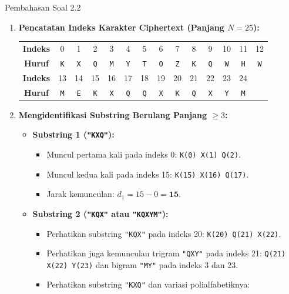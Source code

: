 \documentclass[11pt,a4paper]{article}
\begin{document}
\begin{solusibox}{Pembahasan Soal 2.2}
\begin{enumerate}[leftmargin=*]
    \item \textbf{Pencatatan Indeks Karakter Ciphertext (Panjang $N = 25$):}
    \begin{center}
    \footnotesize
    \begin{tabular}{c ccccc ccccc ccc}
    \toprule
    \textbf{Indeks} & 0 & 1 & 2 & 3 & 4 & 5 & 6 & 7 & 8 & 9 & 10 & 11 & 12 \\
    \textbf{Huruf}  & \texttt{K} & \texttt{X} & \texttt{Q} & \texttt{M} & \texttt{Y} & \texttt{T} & \texttt{O} & \texttt{Z} & \texttt{K} & \texttt{Q} & \texttt{W} & \texttt{H} & \texttt{W} \\
    \midrule
    \textbf{Indeks} & 13 & 14 & 15 & 16 & 17 & 18 & 19 & 20 & 21 & 22 & 23 & 24 & \\
    \textbf{Huruf}  & \texttt{M} & \texttt{E} & \texttt{K} & \texttt{X} & \texttt{Q} & \texttt{Q} & \texttt{X} & \texttt{K} & \texttt{Q} & \texttt{X} & \texttt{Y} & \texttt{M} & \\
    \bottomrule
    \end{tabular}
    \end{center}
    \item \textbf{Mengidentifikasi Substring Berulang Panjang $\ge 3$:}
    \begin{itemize}
        \item \textbf{Substring 1 (\texttt{"KXQ"}):}
        \begin{itemize}
            \item Muncul pertama kali pada indeks 0: \texttt{K(0) X(1) Q(2)}.
            \item Muncul kedua kali pada indeks 15: \texttt{K(15) X(16) Q(17)}.
            \item Jarak kemunculan: $d_1 = 15 - 0 = \mathbf{15}$.
        \end{itemize}
        \item \textbf{Substring 2 (\texttt{"KQX"} atau \texttt{"KQXYM"}):}
        \begin{itemize}
            \item Perhatikan substring \texttt{"KQX"} pada indeks 20: \texttt{K(20) Q(21) X(22)}.
            \item Perhatikan juga kemunculan trigram \texttt{"QXY"} pada indeks 21: \texttt{Q(21) X(22) Y(23)} dan bigram \texttt{"MY"} pada indeks 3 dan 23.
            \item Perhatikan substring \texttt{"KXQ"} dan variasi polialfabetiknya:

\end{itemize}
\end{itemize}
\end{enumerate}
\end{solusibox}
\end{document}
